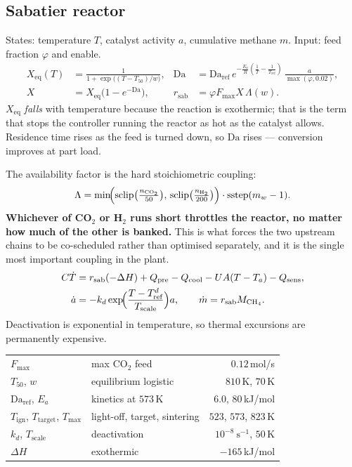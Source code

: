 \documentclass[11pt,a4paper]{article}
\newcommand{\sclip}{\operatorname{sclip}}
\newcommand{\sstep}{\operatorname{sstep}}
\begin{document}
\subsection{Sabatier reactor}

States: temperature $T$, catalyst activity $a$, cumulative methane $m$. Input:
feed fraction $\varphi$ and enable.
\begin{align}
X_{\text{eq}}(T) &= \frac{1}{1+\exp\bigl((T-T_{50})/w\bigr)}, &
\mathrm{Da} &= \mathrm{Da}_{\text{ref}}\,e^{-\frac{E_a}{R}(\frac1T-\frac1{T_{\text{ref}}})}\,\frac{a}{\max(\varphi,0.02)},\\
X &= X_{\text{eq}}\bigl(1-e^{-\mathrm{Da}}\bigr), &
r_{\text{sab}} &= \varphi F_{\max} X \, \Lambda(w).
\end{align}
$X_{\text{eq}}$ \emph{falls} with temperature because the reaction is
exothermic; that is the term that stops the controller running the reactor as
hot as the catalyst allows. Residence time rises as the feed is turned down, so
$\mathrm{Da}$ rises --- conversion improves at part load.

The availability factor is the hard stoichiometric coupling:
\begin{equation}
\Lambda = \min\!\Bigl(\sclip\bigl(\tfrac{n_{\mathrm{CO_2}}}{50}\bigr),\,
                      \sclip\bigl(\tfrac{n_{\mathrm{H_2}}}{200}\bigr)\Bigr)\cdot\sstep(m_w-1).
\end{equation}
\textbf{Whichever of CO$_2$ or H$_2$ runs short throttles the reactor, no matter
how much of the other is banked.} This is what forces the two upstream chains to
be co-scheduled rather than optimised separately, and it is the single most
important coupling in the plant.
\begin{align}
C\dot T &= r_{\text{sab}}(-\Delta H) + Q_{\text{pre}} - Q_{\text{cool}} - UA(T-T_a) - Q_{\text{sens}}, \\
\dot a &= -k_d \exp\!\Bigl(\frac{T-T_{\text{ref}}^d}{T_{\text{scale}}}\Bigr) a,
\qquad \dot m = r_{\text{sab}} M_{\mathrm{CH_4}} .
\end{align}
Deactivation is exponential in temperature, so thermal excursions are
permanently expensive.

\begin{center}\small
\begin{tabular}{llr}
\toprule
$F_{\max}$ & max CO$_2$ feed & $0.12$\,mol/s\\
$T_{50}$, $w$ & equilibrium logistic & $810$\,K, $70$\,K\\
$\mathrm{Da}_{\text{ref}}$, $E_a$ & kinetics at $573$\,K & $6.0$, $80$\,kJ/mol\\
$T_{\text{ign}}$, $T_{\text{target}}$, $T_{\max}$ & light-off, target, sintering & $523$, $573$, $823$\,K\\
$k_d$, $T_{\text{scale}}$ & deactivation & $10^{-8}\ \mathrm{s^{-1}}$, $50$\,K\\
$\Delta H$ & exothermic & $-165$\,kJ/mol\\
\bottomrule
\end{tabular}
\end{center}
\end{document}
